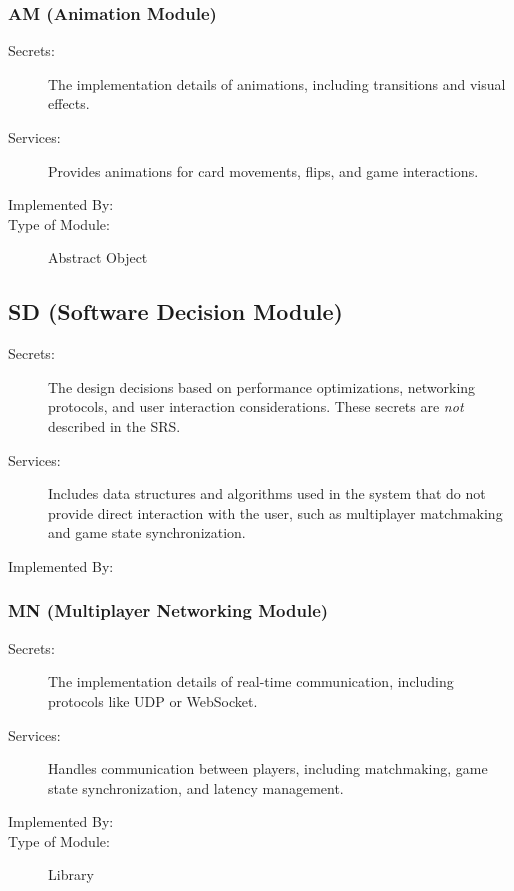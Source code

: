\documentclass[12pt, titlepage]{article}
\begin{document}
\subsubsection{AM (Animation Module)}

\begin{description}
\item[Secrets:] The implementation details of animations, including transitions and visual effects.
\item[Services:] Provides animations for card movements, flips, and game interactions.
\item[Implemented By:] \progname{}
\item[Type of Module:] Abstract Object
\end{description}

\subsection{SD (Software Decision Module)}

\begin{description}
\item[Secrets:] The design decisions based on performance optimizations, networking protocols, and user interaction considerations. These secrets are \emph{not} described in the SRS.
\item[Services:] Includes data structures and algorithms used in the system that
  do not provide direct interaction with the user, such as multiplayer matchmaking and game state synchronization.
\item[Implemented By:] \progname{}
\end{description}

\subsubsection{MN (Multiplayer Networking Module)}

\begin{description}
\item[Secrets:] The implementation details of real-time communication, including protocols like UDP or WebSocket.
\item[Services:] Handles communication between players, including matchmaking, game state synchronization, and latency management.
\item[Implemented By:] \progname{}
\item[Type of Module:] Library
\end{description}
\end{document}
